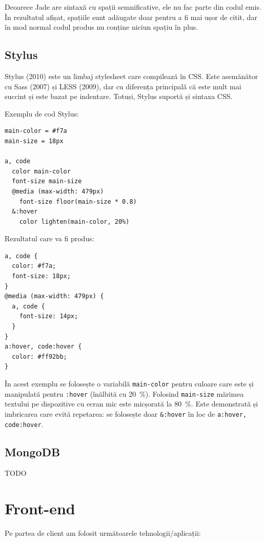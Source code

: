 \documentclass[a4wide,12pt]{report}
\newcommand{\eng}[1]{{#1}} %
\newcommand{\cod}[1]{\texttt{#1}}
\newcommand{\idee}[1]{{\color{red} #1}}
\begin{document}
Deoarece Jade are sintaxă cu spații semnificative, ele nu fac parte din codul
emis. În rezultatul afișat, spațiile sunt adăugate doar pentru a fi mai ușor
de citit, dar în mod normal codul produs nu conține niciun spațiu în plus.

\subsection{Stylus}

Stylus (2010) este un limbaj \eng{stylesheet} care compilează în CSS. Este
asemănător cu Sass (2007) și LESS (2009), dar cu diferența principală că este
mult mai succint și este bazat pe indentare. Totuși, Stylus suportă și sintaxa
CSS.

Exemplu de cod Stylus:

\begin{verbatim}
main-color = #f7a
main-size = 18px

a, code
  color main-color
  font-size main-size
  @media (max-width: 479px)
    font-size floor(main-size * 0.8)
  &:hover
    color lighten(main-color, 20%)
\end{verbatim}

Rezultatul care va fi produs:

\begin{verbatim}
a, code {
  color: #f7a;
  font-size: 18px;
}
@media (max-width: 479px) {
  a, code { 
    font-size: 14px;
  }
}
a:hover, code:hover {
  color: #ff92bb;
}
\end{verbatim}

În acest exemplu se folosește o variabilă \cod{main-color} pentru culoare care este și
manipulată pentru \cod{:hover} (înălbită cu 20~\%). Folosind \cod{main-size}
mărimea textului pe dispozitive cu ecran mic este micșorată la 80~\%. Este
demonstrată și imbricarea care evită repetarea: se folosește doar \cod{\&:hover}
în loc de \cod{a:hover, code:hover}.

\subsection{MongoDB}

\idee{TODO}

\section{\eng{Front-end}}

Pe partea de client am folosit următoarele tehnologii/aplicații:
\end{document}
